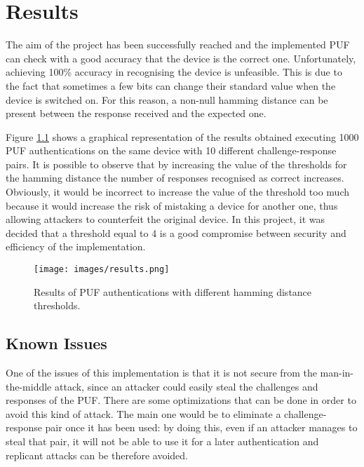 \chapter{Results}

The aim of the project has been successfully reached and the implemented PUF can check with a good accuracy that the device is the correct one.
Unfortunately, achieving 100\% accuracy in recognising the device is unfeasible. This is due to the fact that sometimes a few bits can change their standard value when the device is switched on.
For this reason, a non-null hamming distance can be present between the response received and the expected one.

Figure \ref{fig:Results} shows a graphical representation of the results obtained executing 1000 PUF authentications on the same device with 10 different challenge-response pairs.
It is possible to observe that by increasing the value of the thresholds for the hamming distance the number of responses recognised as correct increases.
Obviously, it would be incorrect to increase the value of the threshold too much because it would increase the risk of mistaking a device for another one, thus allowing attackers to counterfeit the original device. In this project, it was decided that a threshold equal to 4 is a good compromise between security and efficiency of the implementation.

\begin{figure}[tb]
\texttt{[image: images/results.png]}
\caption{Results of PUF authentications with different hamming distance thresholds. }
\label{fig:Results} %
\end{figure}


\section{Known Issues}
One of the issues of this implementation is that it is not secure from the man-in-the-middle attack, since an attacker could easily steal the challenges and responses of the PUF.
There are some optimizations that can be done in order to avoid this kind of attack.
The main one would be to eliminate a challenge-response pair once it has been used: by doing this, even if an attacker manages to steal that pair, it will not be able to use it for a later authentication and replicant attacks can be therefore avoided.

